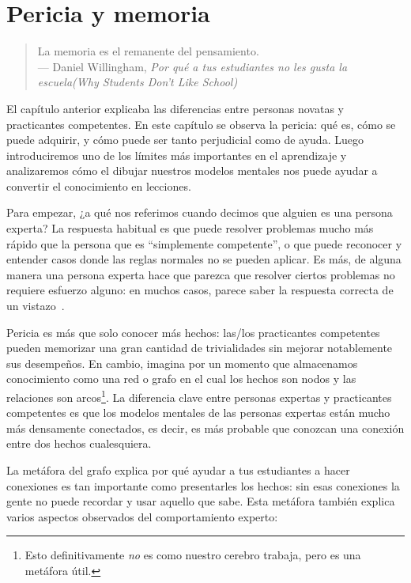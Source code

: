 \chapter{Pericia y memoria}\label{s:memory}

\begin{quote}

  La memoria es el remanente del pensamiento. \\
  --- Daniel Willingham, \emph{Por qué a tus estudiantes no les gusta la escuela(Why Students Don't Like School)}

\end{quote}

El capítulo anterior explicaba las diferencias entre personas novatas y practicantes competentes.
En este capítulo se observa la pericia:
qué es,
cómo se puede adquirir,
y cómo puede ser tanto perjudicial como de ayuda.
Luego introduciremos uno de los límites más importantes en el aprendizaje
y analizaremos cómo el dibujar nuestros modelos mentales nos puede ayudar a convertir el conocimiento en lecciones.

Para empezar,
¿a qué nos referimos cuando decimos que alguien es una persona experta?
La respuesta habitual es que puede resolver problemas mucho más rápido que la persona que es ``simplemente competente'',
o que puede reconocer y entender casos donde las reglas normales no se pueden aplicar.
Es más, de alguna manera una persona experta hace que parezca que resolver ciertos problemas no requiere esfuerzo alguno:
en muchos casos,
parece saber la respuesta correcta de un vistazo~\cite{Parn2017}.

Pericia es más que solo conocer más hechos:
las/los practicantes competentes pueden memorizar una gran cantidad de trivialidades sin  mejorar notablemente sus desempeños.
En cambio,
imagina por un momento que almacenamos conocimiento como una red o grafo en el cual los hechos son nodos
y las relaciones son arcos\footnote{Esto definitivamente \emph{no} es como nuestro cerebro trabaja, pero es una metáfora útil.}.
La diferencia clave entre personas expertas y practicantes competentes es que
los modelos mentales de las personas expertas están mucho más densamente conectados, 
es decir, es más probable que conozcan una conexión entre dos hechos cualesquiera.

La metáfora del grafo explica por qué ayudar a tus estudiantes a hacer conexiones es tan importante como presentarles los hechos:
sin esas conexiones
la gente no puede recordar y usar aquello que sabe.
Esta metáfora también explica varios aspectos observados del comportamiento experto:


